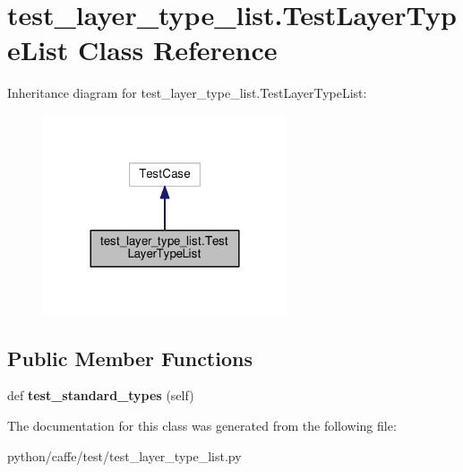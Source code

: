 \hypertarget{classtest__layer__type__list_1_1_test_layer_type_list}{}\section{test\+\_\+layer\+\_\+type\+\_\+list.\+Test\+Layer\+Type\+List Class Reference}
\label{classtest__layer__type__list_1_1_test_layer_type_list}


Inheritance diagram for test\+\_\+layer\+\_\+type\+\_\+list.\+Test\+Layer\+Type\+List\+:
\nopagebreak
\begin{figure}[H]
\begin{center}
\leavevmode
\includegraphics[width=204pt]{classtest__layer__type__list_1_1_test_layer_type_list__inherit__graph}
\end{center}
\end{figure}
\subsection*{Public Member Functions}
\begin{DoxyCompactItemize}
\item 
\mbox{\label{classtest__layer__type__list_1_1_test_layer_type_list_a59e0a4c1a1daad17bc0560ce5625b6b5}} 
def {\bfseries test\+\_\+standard\+\_\+types} (self)
\end{DoxyCompactItemize}


The documentation for this class was generated from the following file\+:\begin{DoxyCompactItemize}
\item 
python/caffe/test/test\+\_\+layer\+\_\+type\+\_\+list.\+py\end{DoxyCompactItemize}
